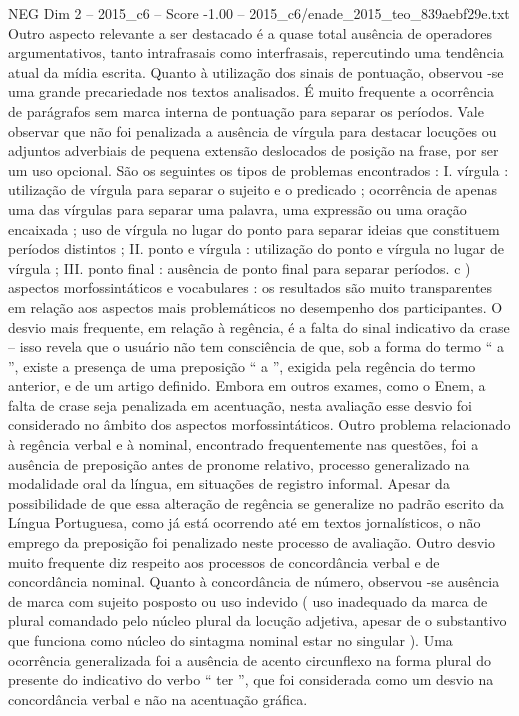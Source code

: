 \begin{textsample}{NEG Dim 2 – 2015\_c6 – Score -1.00 – 2015\_c6/enade\_2015\_teo\_839aebf29e.txt}
Outro aspecto relevante a ser destacado é a quase total ausência de operadores argumentativos, tanto intrafrasais como interfrasais, repercutindo uma tendência atual da mídia escrita.
Quanto à utilização dos sinais de pontuação, observou -se uma grande precariedade nos textos analisados.
É muito frequente a ocorrência de parágrafos sem marca interna de pontuação para separar os períodos.
Vale observar que não foi penalizada a ausência de vírgula para destacar locuções ou adjuntos adverbiais de pequena extensão deslocados de posição na frase, por ser um uso opcional.
São os seguintes os tipos de problemas encontrados : I. vírgula : utilização de vírgula para separar o sujeito e o predicado ; ocorrência de apenas uma das vírgulas para separar uma palavra, uma expressão ou uma oração encaixada ; uso de vírgula no lugar do ponto para separar ideias que constituem períodos distintos ; II. ponto e vírgula : utilização do ponto e vírgula no lugar de vírgula ; III. ponto final : ausência de ponto final para separar períodos. c ) aspectos morfossintáticos e vocabulares : os resultados são muito transparentes em relação aos aspectos mais problemáticos no desempenho dos participantes.
O desvio mais frequente, em relação à regência, é a falta do sinal indicativo da crase – isso revela que o usuário não tem consciência de que, sob a forma do termo “ a ”, existe a presença de uma preposição “ a ”, exigida pela regência do termo anterior, e de um artigo definido.
Embora em outros exames, como o Enem, a falta de crase seja penalizada em acentuação, nesta avaliação esse desvio foi considerado no âmbito dos aspectos morfossintáticos.
Outro problema relacionado à regência verbal e à nominal, encontrado frequentemente nas questões, foi a ausência de preposição antes de pronome relativo, processo generalizado na modalidade oral da língua, em situações de registro informal.
Apesar da possibilidade de que essa alteração de regência se generalize no padrão escrito da Língua Portuguesa, como já está ocorrendo até em textos jornalísticos, o não emprego da preposição foi penalizado neste processo de avaliação.
Outro desvio muito frequente diz respeito aos processos de concordância verbal e de concordância nominal.
Quanto à concordância de número, observou -se ausência de marca com sujeito posposto ou uso indevido ( uso inadequado da marca de plural comandado pelo núcleo plural da locução adjetiva, apesar de o substantivo que funciona como núcleo do sintagma nominal estar no singular ).
Uma ocorrência generalizada foi a ausência de acento circunflexo na forma plural do presente do indicativo do verbo “ ter ”, que foi considerada como um desvio na concordância verbal e não na acentuação gráfica.

\end{textsample}
